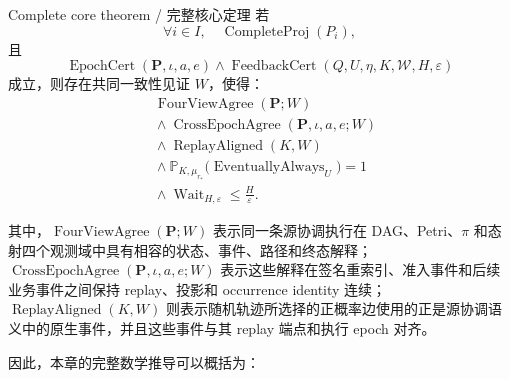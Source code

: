     \begin{MWCallout}[MWLilac]{Complete core theorem / 完整核心定理}
      若
      \begin{equation}
        \forall i\in I,\quad
        \operatorname{CompleteProj}(P_i),
        \label{eq:core-all-projections-complete}
      \end{equation}
      且
      \begin{equation}
        \operatorname{EpochCert}
        (\mathbf P,\iota,a,e)
        \land
        \operatorname{FeedbackCert}
        (Q,U,\eta,K,\mathcal W,H,\varepsilon)
        \label{eq:core-epoch-feedback-assumptions}
      \end{equation}
      成立，则存在共同一致性见证 $W$，使得：
      \begin{equation}
          \begin{aligned}
            &
            \operatorname{FourViewAgree}
            (\mathbf P;W)
            \\
            &{}\land
            \operatorname{CrossEpochAgree}
            (\mathbf P,\iota,a,e;W)
            \\
            &{}\land
            \operatorname{ReplayAligned}
            (K,W)
            \\
            &{}\land
            \mathbb P_{K,\mu_{r_\ast}}
            \bigl(
              \operatorname{EventuallyAlways}_{U}
            \bigr)
            =1
            \\
            &{}\land
            \operatorname{Wait}_{H,\varepsilon}
            \le
            \frac{H}{\varepsilon}.
          \end{aligned}
        \label{eq:cantilune-complete-core-theorem}
      \end{equation}
    \end{MWCallout}

    其中，$\operatorname{FourViewAgree}(\mathbf P;W)$ 表示同一条源协调执行在 DAG、Petri、$\pi$ 和态射四个观测域中具有相容的状态、事件、路径和终态解释；$\operatorname{CrossEpochAgree}(\mathbf P,\iota,a,e;W)$ 表示这些解释在签名重索引、准入事件和后续业务事件之间保持 replay、投影和 occurrence identity 连续；$\operatorname{ReplayAligned}(K,W)$ 则表示随机轨迹所选择的正概率边使用的正是源协调语义中的原生事件，并且这些事件与其 replay 端点和执行 epoch 对齐。

    因此，本章的完整数学推导可以概括为：

